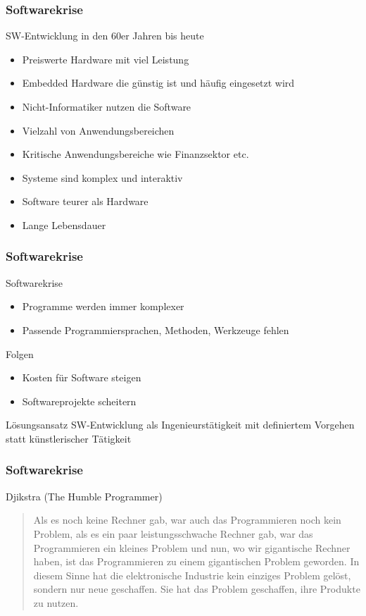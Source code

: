 \begin{frame}
\frametitle{Softwarekrise}
	SW-Entwicklung in den 60er Jahren bis heute
	\small
	\begin{itemize}
		\item Preiswerte Hardware mit viel Leistung
		\item Embedded Hardware die günstig ist und häufig eingesetzt wird
		\item Nicht-Informatiker nutzen die Software
		\item Vielzahl von Anwendungsbereichen
	  	\item Kritische Anwendungsbereiche wie Finanzsektor etc.
	  	\item Systeme sind komplex und interaktiv
		\item Software teurer als Hardware
		\item Lange Lebensdauer
	\end{itemize}
	\normalsize
\end{frame}

\begin{frame}
\frametitle{Softwarekrise}
	\begin{block}{Softwarekrise}
		\begin{itemize}
			 \item Programme werden immer komplexer
			 \item Passende Programmiersprachen, Methoden, Werkzeuge fehlen
		\end{itemize}
	\end{block}
	\begin{alertblock}{Folgen}
		\begin{itemize}
			 \item Kosten für Software steigen
			 \item Softwareprojekte scheitern
		\end{itemize}
	\end{alertblock}
	\begin{exampleblock}{Lösungsansatz}
		SW-Entwicklung als Ingenieurstätigkeit mit definiertem Vorgehen
		statt künstlerischer Tätigkeit
	\end{exampleblock}
\end{frame}

\begin{frame}
\frametitle{Softwarekrise}
	\begin{block}{Djikstra (The Humble Programmer)}
		\begin{quote}
			Als es noch keine Rechner gab, war auch das Programmieren noch kein
			Problem, als es ein paar leistungsschwache Rechner gab, war das
			Programmieren ein kleines Problem und nun, wo wir gigantische Rechner
			haben, ist das Programmieren zu einem gigantischen Problem geworden.
			In diesem Sinne hat die elektronische Industrie kein einziges Problem
			gelöst, sondern nur neue geschaffen. Sie hat das Problem geschaffen,
			ihre Produkte zu nutzen.
		\end{quote}
	\end{block}
\end{frame}

